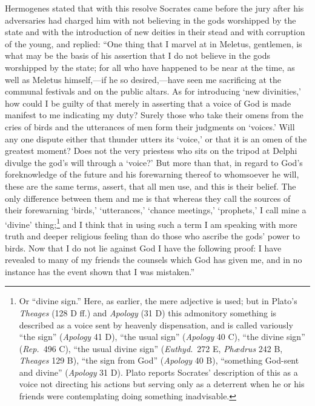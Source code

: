 \documentclass[12pt]{article}
\begin{document}
Hermogenes stated that with this resolve Socrates came before the jury after
his adversaries had charged him with not believing in the gods worshipped by
the state and with the introduction of new deities in their stead and with
corruption of the young, and replied: ``One thing that I marvel at in Meletus,
gentlemen, is what may be the basis of his assertion that I do not believe in
the gods worshipped by the state; for all who have happened to be near at the
time, as well as Meletus himself,---if he so desired,---have seen me
sacrificing at the communal festivals and on the public altars. As for
introducing `new divinities,' how could I be guilty of that merely in
asserting that a voice of God is made manifest to me indicating my duty? Surely
those who take their omens from the cries of birds and the utterances of men
form their judgments on `voices.' Will any one dispute either that thunder
utters its `voice,' or that it is an omen of the greatest moment? Does not the
very priestess who sits on the tripod at Delphi divulge the god's will through
a `voice?' But more than that, in regard to God's foreknowledge of the future
and his forewarning thereof to whomsoever he will, these are the same terms,
assert, that all men use, and this is their belief. The only difference between
them and me is that whereas they call the sources of their forewarning
`birds,' `utterances,' `chance meetings,' `prophets,' I call mine a `divine'
thing;\footnote{Or ``divine sign.'' Here, as earlier, the mere adjective is
used; but in Plato's \textit{Theages} (128 D ff.) and \textit{Apology} (31 D)
this admonitory something is described as a voice sent by heavenly
dispensation, and is called variously ``the sign'' (\textit{Apology} 41 D),
``the usual sign'' (\textit{Apology} 40 C), ``the divine sign''
(\textit{Rep.}~496 C), ``the usual divine sign'' (\textit{Euthyd.}~272 E,
\textit{Ph{\ae}drus} 242 B, \textit{Theages} 129 B), ``the sign from God''
(\textit{Apology} 40 B), ``something God-sent and divine'' (\textit{Apology} 31
D). Plato reports Socrates' description of this as a voice not directing his
actions but serving only as a deterrent when he or his friends were
contemplating doing something inadvisable.} and I think that in using such a
term I am speaking with more truth and deeper religious feeling than do those
who ascribe the gods' power to birds. Now that I do not lie against God I have
the following proof: I have revealed to many of my friends the counsels which
God has given me, and in no instance has the event shown that I was mistaken.''
\end{document}
